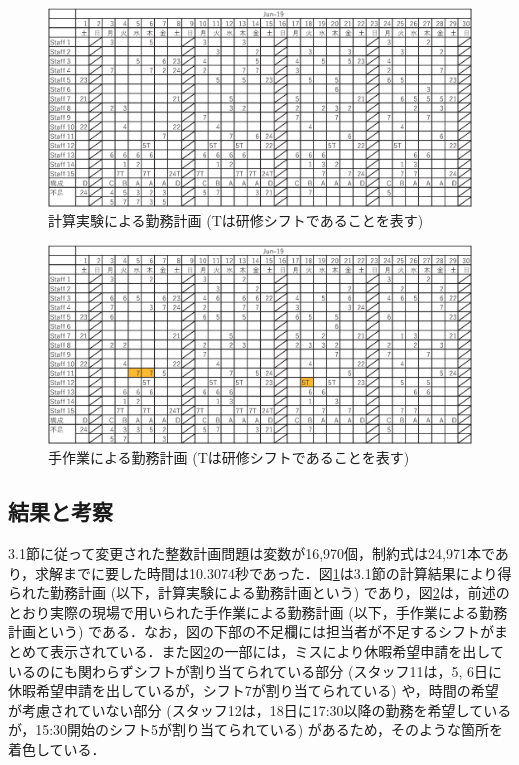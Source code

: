\documentclass[11pt]{jsarticle}
\begin{document}
\begin{figure}
  \begin{center}
    \includegraphics[width = 13.2cm]{figs/june_optimal.eps}
  \end{center}
  \caption{計算実験による勤務計画 (Tは研修シフトであることを表す)}
  \label{fig:optimal}
\end{figure}
\begin{figure}
  \begin{center}
    \includegraphics[width = 13.2cm]{figs/june_operation.eps}
  \end{center}
  \caption{手作業による勤務計画 (Tは研修シフトであることを表す)}
  \label{fig:operation}
\end{figure}

\vspace{\baselineskip}
\subsection{結果と考察}
3.1節に従って変更された整数計画問題は変数が16,970個，制約式は24,971本であり，求解までに要した時間は10.3074秒であった．図\ref{fig:optimal}は3.1節の計算結果により得られた勤務計画 (以下，計算実験による勤務計画という) であり，図\ref{fig:operation}は，前述のとおり実際の現場で用いられた手作業による勤務計画 (以下，手作業による勤務計画という) である．なお，図の下部の不足欄には担当者が不足するシフトがまとめて表示されている．また図\ref{fig:operation}の一部には，ミスにより休暇希望申請を出しているのにも関わらずシフトが割り当てられている部分 (スタッフ11は，5, 6日に休暇希望申請を出しているが，シフト7が割り当てられている) や，時間の希望が考慮されていない部分 (スタッフ12は，18日に17:30以降の勤務を希望しているが，15:30開始のシフト5が割り当てられている) があるため，そのような箇所を着色している．
\end{document}
